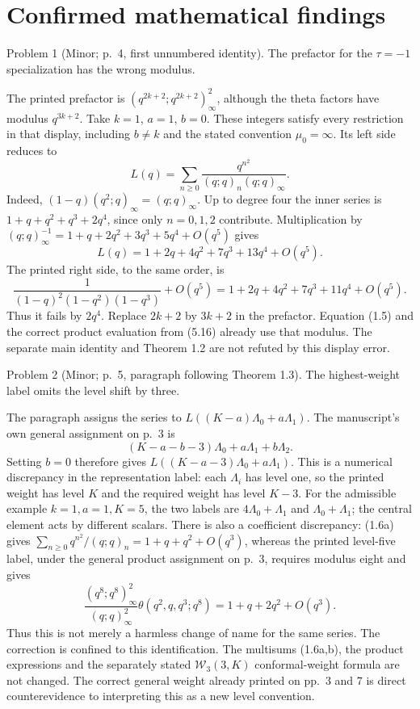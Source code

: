 \documentclass[10pt]{article}
\begin{document}
\section*{Confirmed mathematical findings}
Problem 1 (Minor; p. 4, first unnumbered identity).  The prefactor for the \(\tau=-1\) specialization has the wrong modulus.\par
The printed prefactor is \((q^{2k+2};q^{2k+2})_\infty^2\), although the theta factors have modulus \(q^{3k+2}\). Take \(k=1\), \(a=1\), \(b=0\). These integers satisfy every restriction in that display, including \(b\ne k\) and the stated convention \(\mu_0=\infty\). Its left side reduces to \[L(q)=\sum_{n\ge0}\frac{q^{n^2}}{(q;q)_n(q;q)_\infty}.\] Indeed, \((1-q)(q^2;q)_\infty=(q;q)_\infty\). Up to degree four the inner series is \(1+q+q^2+q^3+2q^4\), since only \(n=0,1,2\) contribute. Multiplication by \((q;q)_\infty^{-1}=1+q+2q^2+3q^3+5q^4+O(q^5)\) gives \[L(q)=1+2q+4q^2+7q^3+13q^4+O(q^5).\] The printed right side, to the same order, is \[\frac1{(1-q)^2(1-q^2)(1-q^3)}+O(q^5)
 =1+2q+4q^2+7q^3+11q^4+O(q^5).\] Thus it fails by \(2q^4\). Replace \(2k+2\) by \(3k+2\) in the prefactor. Equation (1.5) and the correct product evaluation from (5.16) already use that modulus. The separate main identity and Theorem 1.2 are not refuted by this display error.\par
Problem 2 (Minor; p. 5, paragraph following Theorem 1.3).  The highest-weight label omits the level shift by three.\par
The paragraph assigns the series to \(L((K-a)\Lambda_0+a\Lambda_1)\). The manuscript’s own general assignment on p. 3 is \[(K-a-b-3)\Lambda_0+a\Lambda_1+b\Lambda_2.\] Setting \(b=0\) therefore gives \(L((K-a-3)\Lambda_0+a\Lambda_1)\). This is a numerical discrepancy in the representation label: each \(\Lambda_i\) has level one, so the printed weight has level \(K\) and the required weight has level \(K-3\). For the admissible example \(k=1,a=1,K=5\), the two labels are \(4\Lambda_0+\Lambda_1\) and \(\Lambda_0+\Lambda_1\); the central element acts by different scalars. There is also a coefficient discrepancy: (1.6a) gives \(\sum_{n\ge0}q^{n^2}/(q;q)_n
=1+q+q^2+O(q^3)\), whereas the printed level-five label, under the general product assignment on p. 3, requires modulus eight and gives \[\frac{(q^8;q^8)_\infty^2}{(q;q)_\infty^2}
 \theta(q^2,q,q^3;q^8)=1+q+2q^2+O(q^3).\] Thus this is not merely a harmless change of name for the same series. The correction is confined to this identification. The multisums (1.6a,b), the product expressions and the separately stated \(\mathcal W_3(3,K)\) conformal-weight formula are not changed. The correct general weight already printed on pp. 3 and 7 is direct counterevidence to interpreting this as a new level convention.\par
\end{document}
